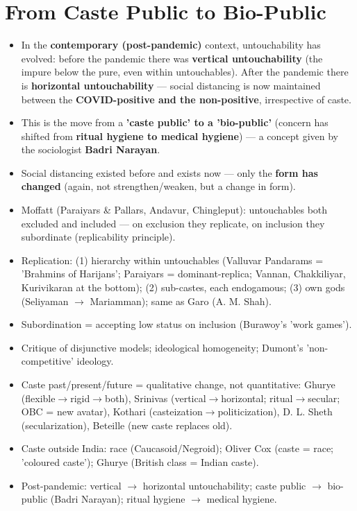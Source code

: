 \section{From Caste Public to Bio-Public}

\begin{KeyConcept}
\begin{itemize}
\item In the \textbf{contemporary (post-pandemic)} context, untouchability has evolved: before the pandemic there was \textbf{vertical untouchability} (the impure below the pure, even within untouchables). After the pandemic there is \textbf{horizontal untouchability} --- social distancing is now maintained between the \textbf{COVID-positive and the non-positive}, irrespective of caste.
\item This is the move from a \textbf{'caste public' to a 'bio-public'} (concern has shifted from \textbf{ritual hygiene to medical hygiene}) --- a concept given by the sociologist \textbf{Badri Narayan}.
\item Social distancing existed before and exists now --- only the \textbf{form has changed} (again, not strengthen/weaken, but a change in form).
\end{itemize}
\end{KeyConcept}

\begin{QuickRevision}
\begin{itemize}
\item Moffatt (Paraiyars \& Pallars, Andavur, Chingleput): untouchables both excluded and included --- on exclusion they replicate, on inclusion they subordinate (replicability principle).
\item Replication: (1) hierarchy within untouchables (Valluvar Pandarams = 'Brahmins of Harijans'; Paraiyars = dominant-replica; Vannan, Chakkiliyar, Kurivikaran at the bottom); (2) sub-castes, each endogamous; (3) own gods (Seliyaman $\rightarrow$ Mariamman); same as Garo (A. M. Shah).
\item Subordination = accepting low status on inclusion (Burawoy's 'work games').
\item Critique of disjunctive models; ideological homogeneity; Dumont's 'non-competitive' ideology.
\item Caste past/present/future = qualitative change, not quantitative: Ghurye (flexible$\rightarrow$rigid$\rightarrow$both), Srinivas (vertical$\rightarrow$horizontal; ritual$\rightarrow$secular; OBC = new avatar), Kothari (casteization$\rightarrow$politicization), D. L. Sheth (secularization), Beteille (new caste replaces old).
\item Caste outside India: race (Caucasoid/Negroid); Oliver Cox (caste = race; 'coloured caste'); Ghurye (British class = Indian caste).
\item Post-pandemic: vertical $\rightarrow$ horizontal untouchability; caste public $\rightarrow$ bio-public (Badri Narayan); ritual hygiene $\rightarrow$ medical hygiene.
\end{itemize}
\end{QuickRevision}

